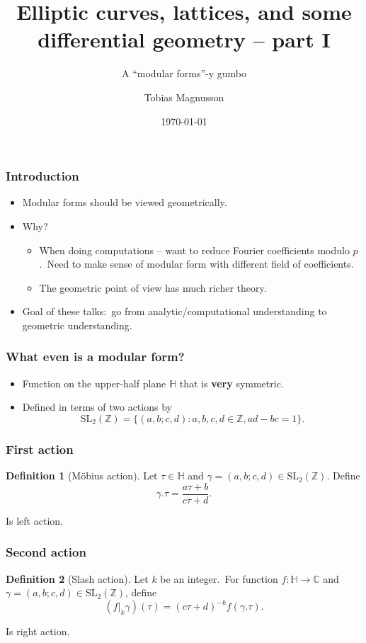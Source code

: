 \documentclass[usenames,dvipsnames]{beamer}
\title{Elliptic curves, lattices, and some differential geometry -- part I}
\subtitle{A ``modular forms''-y gumbo}
\author{Tobias Magnusson}
\institute{Chalmers University of Technology}
\date{\today}
\theoremstyle{definition}
\newtheorem{defi}{Definition}
\begin{document}
\begin{frame}[plain]
\titlepage
\end{frame}

\begin{frame}
  \frametitle{Introduction}
  \begin{itemize}
    \item Modular forms should be viewed geometrically.\pause
    \item Why?\pause
      \begin{itemize}
        \item When doing computations -- want to reduce Fourier coefficients modulo $p$.\pause~Need to make sense of modular form with different field of coefficients.\pause
        \item The geometric point of view has much richer theory.\pause
      \end{itemize}
    \item Goal of these talks:\pause~go from analytic/computational understanding to geometric understanding.
  \end{itemize}
\end{frame}

\begin{frame}
  \frametitle{What even is a modular form?}
  \begin{itemize}
    \item Function on the upper-half plane $\mathbb{H}$ that is {\bf very} symmetric.\pause
    \item Defined in terms of two actions by\pause
      \[\mathrm{SL}_2(\mathbb{Z})=\{(a,b;c,d):a,b,c,d\in\mathbb{Z},ad-bc=1\}.\]
  \end{itemize}
\end{frame}

\begin{frame}
  \frametitle{First action}
  \begin{defi}[Möbius action]
    Let $\tau\in\mathbb{H}$ and $\gamma=(a,b;c,d)\in\mathrm{SL}_2(\mathbb{Z})$. Define\pause
    \[\gamma.\tau=\frac{a\tau+b}{c\tau+d}.\]\pause
  \end{defi}
  Is left action.
\end{frame}

\begin{frame}
  \frametitle{Second action}
  \begin{defi}[Slash action]
    Let $k$ be an integer.\pause~For function $f:\mathbb{H}\to\mathbb{C}$ and $\gamma=(a,b;c,d)\in\mathrm{SL}_2(\mathbb{Z})$, define\pause
    \[(f|_k\gamma)(\tau)=(c\tau+d)^{-k}f(\gamma.\tau).\]\pause
  \end{defi}
  Is right action.
\end{frame}
\end{document}
